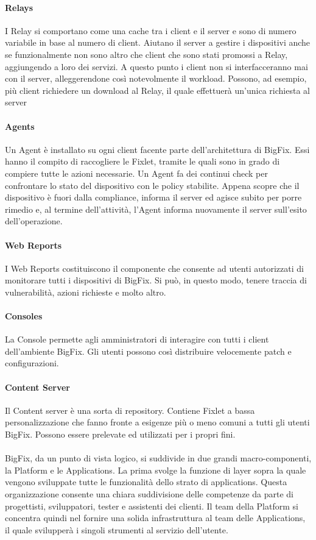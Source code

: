 \paragraph{Relays}
I Relay si comportano come una cache tra i client e il server e sono di numero variabile in base al numero di client. Aiutano il server a gestire i dispositivi anche se funzionalmente non sono altro che client che sono stati promossi a Relay, aggiungendo a loro dei servizi. A questo punto i client non si interfacceranno mai con il server, alleggerendone così notevolmente il workload. Possono, ad esempio, più client richiedere un download al Relay, il quale effettuerà un'unica richiesta al server
\paragraph{Agents}
Un Agent è installato su ogni client facente parte dell'architettura di BigFix. Essi hanno il compito di raccogliere le Fixlet, tramite le quali sono in grado di compiere tutte le azioni necessarie. Un Agent fa dei continui check per confrontare lo stato del dispositivo con le policy stabilite. Appena scopre che il dispositivo è fuori dalla compliance, informa il server ed agisce subito per porre rimedio e, al termine dell'attività, l'Agent informa nuovamente il server sull'esito dell'operazione.
\paragraph{Web Reports}
I Web Reports costituiscono il componente che consente ad utenti autorizzati di monitorare tutti i dispositivi di BigFix. Si può, in questo modo, tenere traccia di vulnerabilità, azioni richieste e molto altro.
\paragraph{Consoles}
La Console permette agli amministratori di interagire con tutti i client dell'ambiente BigFix. Gli utenti possono così distribuire velocemente patch e configurazioni.
\paragraph{Content Server}
Il Content server è una sorta di repository. Contiene Fixlet a bassa personalizzazione che fanno fronte a esigenze più o meno comuni a tutti gli utenti BigFix. Possono essere prelevate ed utilizzati per i propri fini.
\paragraph{}
BigFix, da un punto di vista logico, si suddivide in due grandi macro-componenti, la Platform e le Applications. La prima svolge la funzione di layer sopra la quale vengono sviluppate tutte le funzionalità dello strato di applications. Questa organizzazione consente una chiara suddivisione delle competenze da parte di progettisti, sviluppatori, tester e assistenti dei clienti. Il team della Platform si concentra quindi nel fornire una solida infrastruttura al team delle Applications, il quale svilupperà i singoli strumenti al servizio dell'utente.

